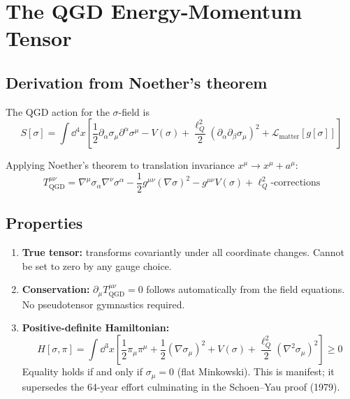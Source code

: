 \documentclass[11pt,a4paper]{article}
\theoremstyle{plain}
\theoremstyle{definition}
\theoremstyle{remark}
\newcommand{\lQ}{\ell_Q}
\begin{document}
\section{The QGD Energy-Momentum Tensor}
\label{sec:tensor}

\subsection{Derivation from Noether's theorem}

The QGD action for the $\sigma$-field is
\begin{equation}
  S[\sigma] = \int\!\dd^4x\left[\frac{1}{2}\partial_\alpha\sigma_\mu\partial^\alpha\sigma^\mu - V(\sigma) + \frac{\lQ^2}{2}(\partial_\alpha\partial_\beta\sigma_\mu)^2 + \mathcal{L}_{\mathrm{matter}}[g[\sigma]]\right]
\end{equation}

Applying Noether's theorem to translation invariance $x^\mu \to x^\mu + a^\mu$:
\begin{equation}
  \boxed{T^{\mu\nu}_{\mathrm{QGD}} = \nabla^\mu\sigma_\alpha\nabla^\nu\sigma^\alpha - \frac{1}{2}g^{\mu\nu}(\nabla\sigma)^2 - g^{\mu\nu}V(\sigma) + \lQ^2\text{-corrections}}
  \label{eq:Tmunu}
\end{equation}

\subsection{Properties}

\begin{enumerate}
  \item \textbf{True tensor:} transforms covariantly under all coordinate changes.  Cannot be set to zero by any gauge choice.
  \item \textbf{Conservation:} $\partial_\mu T^{\mu\nu}_{\mathrm{QGD}} = 0$ follows automatically from the field equations.  No pseudotensor gymnastics required.
  \item \textbf{Positive-definite Hamiltonian:}
  \begin{equation}
    H[\sigma,\pi] = \int\!\dd^3x\left[\frac{1}{2}\pi_\mu\pi^\mu + \frac{1}{2}(\nabla\sigma_\mu)^2 + V(\sigma) + \frac{\lQ^2}{2}(\nabla^2\sigma_\mu)^2\right] \geq 0
    \label{eq:H_positive}
  \end{equation}
  Equality holds if and only if $\sigma_\mu = 0$ (flat Minkowski).  This is manifest; it supersedes the 64-year effort culminating in the Schoen--Yau proof (1979).
\end{enumerate}
\end{document}
